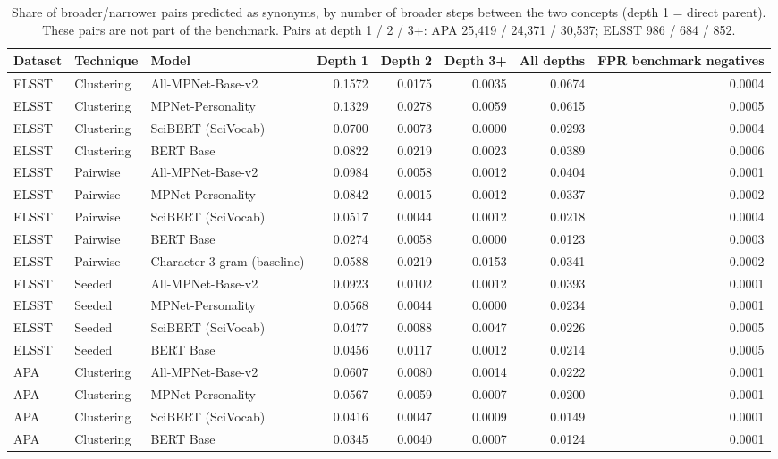 \begin{table}[ht]
\centering
\small
\caption{Share of broader/narrower pairs predicted as synonyms, by number of broader steps between the two concepts (depth 1 = direct parent). These pairs are not part of the benchmark. Pairs at depth 1 / 2 / 3+: APA 25,419 / 24,371 / 30,537; ELSST 986 / 684 / 852.}
\label{tab:S5_broader_narrower}
\begin{tabular}{lllrrrrr}
\toprule
Dataset & Technique & Model & Depth 1 & Depth 2 & Depth 3+ & All depths & FPR benchmark negatives \\
\midrule
ELSST & Clustering & All-MPNet-Base-v2 & 0.1572 & 0.0175 & 0.0035 & 0.0674 & 0.0004 \\
ELSST & Clustering & MPNet-Personality & 0.1329 & 0.0278 & 0.0059 & 0.0615 & 0.0005 \\
ELSST & Clustering & SciBERT (SciVocab) & 0.0700 & 0.0073 & 0.0000 & 0.0293 & 0.0004 \\
ELSST & Clustering & BERT Base & 0.0822 & 0.0219 & 0.0023 & 0.0389 & 0.0006 \\
ELSST & Pairwise & All-MPNet-Base-v2 & 0.0984 & 0.0058 & 0.0012 & 0.0404 & 0.0001 \\
ELSST & Pairwise & MPNet-Personality & 0.0842 & 0.0015 & 0.0012 & 0.0337 & 0.0002 \\
ELSST & Pairwise & SciBERT (SciVocab) & 0.0517 & 0.0044 & 0.0012 & 0.0218 & 0.0004 \\
ELSST & Pairwise & BERT Base & 0.0274 & 0.0058 & 0.0000 & 0.0123 & 0.0003 \\
ELSST & Pairwise & Character 3-gram (baseline) & 0.0588 & 0.0219 & 0.0153 & 0.0341 & 0.0002 \\
ELSST & Seeded & All-MPNet-Base-v2 & 0.0923 & 0.0102 & 0.0012 & 0.0393 & 0.0001 \\
ELSST & Seeded & MPNet-Personality & 0.0568 & 0.0044 & 0.0000 & 0.0234 & 0.0001 \\
ELSST & Seeded & SciBERT (SciVocab) & 0.0477 & 0.0088 & 0.0047 & 0.0226 & 0.0005 \\
ELSST & Seeded & BERT Base & 0.0456 & 0.0117 & 0.0012 & 0.0214 & 0.0005 \\
APA & Clustering & All-MPNet-Base-v2 & 0.0607 & 0.0080 & 0.0014 & 0.0222 & 0.0001 \\
APA & Clustering & MPNet-Personality & 0.0567 & 0.0059 & 0.0007 & 0.0200 & 0.0001 \\
APA & Clustering & SciBERT (SciVocab) & 0.0416 & 0.0047 & 0.0009 & 0.0149 & 0.0001 \\
APA & Clustering & BERT Base & 0.0345 & 0.0040 & 0.0007 & 0.0124 & 0.0001 \\

\end{tabular}
\end{table}
